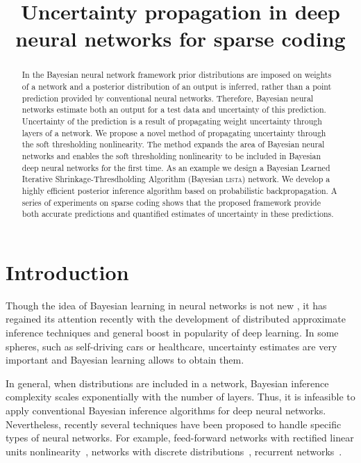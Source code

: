 \documentclass[letterpaper]{article}
\title{Uncertainty propagation in deep neural networks for sparse coding}
\author{} %
\begin{document}
\maketitle

\begin{abstract}
In the Bayesian neural network framework prior distributions are imposed on weights of a network and a posterior distribution of an output is inferred, rather than a point prediction provided by conventional neural networks. Therefore, Bayesian neural networks estimate both an output for a test data and uncertainty of this prediction. Uncertainty of the prediction is a result of propagating weight uncertainty through layers of a network. We propose a novel method of propagating uncertainty through the soft thresholding nonlinearity. The method expands the area of Bayesian neural networks and enables the soft thresholding nonlinearity to be included in Bayesian deep neural networks for the first time. As an example we design a Bayesian Learned Iterative Shrinkage-Thresdholding Algorithm (Bayesian \textsc{lista}) network. We develop a highly efficient posterior inference algorithm based on probabilistic backpropagation. A series of experiments on sparse coding shows that the proposed framework provide both accurate predictions and quantified estimates of uncertainty in these predictions.
\end{abstract}

\section{Introduction}
Though the idea of Bayesian learning in neural networks is not new \citep{neal2012bayesian}, it has regained its attention recently with the development of distributed approximate inference techniques \citep{li2015stochastic, hoffman2013stochastic}  and general boost in popularity of deep learning. In some spheres, such as self-driving cars or healthcare, uncertainty estimates are very important and Bayesian learning allows to obtain them. 

In general, when distributions are included in a network, Bayesian inference complexity scales exponentially with the number of layers. Thus, it is infeasible to apply conventional Bayesian inference algorithms for deep neural networks. Nevertheless, recently several techniques have been proposed to handle specific types of neural networks. For example, feed-forward networks with rectified linear units nonlinearity~\citep{hernandez2015probabilistic}, networks with discrete distributions~\citep{soudry2014expectation}, recurrent networks~\citep{mcdermott2017bayesian}. 
\end{document}
